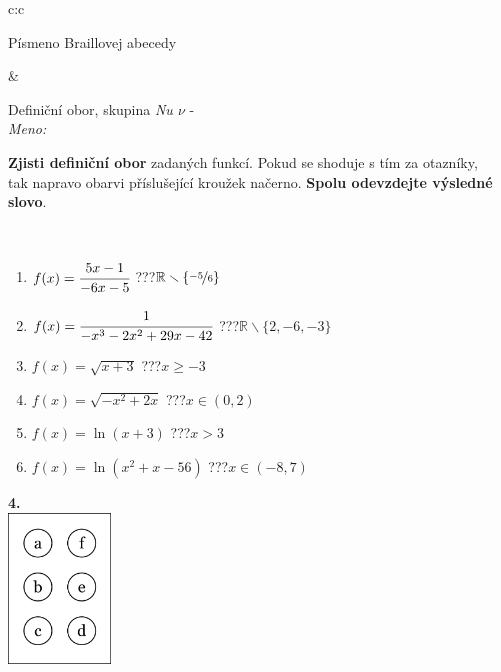 \documentclass[10pt]{report}
\begin{document}
\begin{tabular}{c:c}
\begin{minipage}[c][104.5mm][t]{0.5\linewidth}
\begin{center}
\begin{minipage}{0.20\linewidth}
\begin{center}
{\small Písmeno Braillovej abecedy}
\end{center}
\end{minipage}
\end{center}
\end{minipage}
&
\begin{minipage}[c][104.5mm][t]{0.5\linewidth}
\begin{center}
\vspace{7mm}
{\huge Definiční obor, skupina \textit{Nu $\nu$} -}\\[5mm]
\textit{Meno:}\phantom{xxxxxxxxxxxxxxxxxxxxxxxxxxxxxxxxxxxxxxxxxxxxxxxxxxxxxxxxxxxxxxxxx}\\[5mm]
\begin{minipage}{0.95\linewidth}
\textbf{Zjisti definiční obor} zadaných funkcí. Pokud se shoduje s tím za otazníky,\\tak napravo obarvi příslušející kroužek načerno. \textbf{Spolu odevzdejte výsledné slovo}.
\end{minipage}
\\[1mm]
\begin{minipage}{0.79\linewidth}
\begin{center}
\begin{varwidth}{\linewidth}
\begin{enumerate}
\normalsizerrr
\item $f(x)=\cfrac{5x-1}{-6x-5}$\quad \dotfill\; ???\;\dotfill \quad $\mathbb{R}\smallsetminus\{\nicefrac{-5}{6}\}$
\item $f(x)=\cfrac{1}{-x^3-2x^2+29x-42}$\quad \dotfill\; ???\;\dotfill \quad $\mathbb{R}\smallsetminus\{2,-6,-3\}$
\item $f(x)=\sqrt{x+3}$\quad \dotfill\; ???\;\dotfill \quad $x\geq-3$
\item $f(x)=\sqrt{-x^2+2x}$\quad \dotfill\; ???\;\dotfill \quad $x\in(0 , 2)$
\item $f(x)=\ln{(x+3)}$\quad \dotfill\; ???\;\dotfill \quad $x>3$
\item $f(x)=\ln{(x^2+x-56)}$\quad \dotfill\; ???\;\dotfill \quad $x\in(-8 , 7)$
\end{enumerate}
\end{varwidth}
\end{center}
\end{minipage}
\begin{minipage}{0.20\linewidth}
\begin{center}
{\Huge\bfseries 4.} \\[2mm]
\includegraphics[height=40mm]{../images/braille.png}

\end{center}
\end{minipage}
\end{center}
\end{minipage}
\end{tabular}
\end{document}
